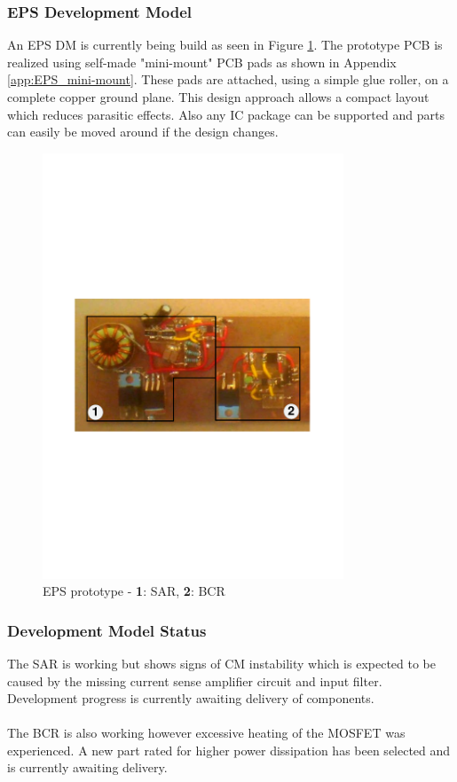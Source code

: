 \subsubsection{EPS Development Model}
An \ac{EPS} \ac{DM} is currently being build as seen in Figure \ref{fig:EPSprototype}. The prototype \ac{PCB} is realized using self-made "mini-mount" \ac{PCB} pads as shown in Appendix \ref{app:EPS_mini-mount}. These pads are attached, using a simple glue roller, on a complete copper ground plane. This design approach allows a compact layout which reduces parasitic effects. Also any \ac{IC} package can be supported and parts can easily be moved around if the design changes.
%
\begin{figure}[H]
\centering
\includegraphics[width=0.8\textwidth]{figures/fig_CDR_EPSprototype}
\caption[EPS prototype]{EPS prototype - \textbf{1}: SAR, \textbf{2}: BCR}
\label{fig:EPSprototype}
\end{figure}
%
\subsubsection*{Development Model Status}
The \ac{SAR} is working but shows signs of \ac{CM} instability which is expected to be caused by the missing current sense amplifier circuit and input filter. Development progress is currently awaiting delivery of components.
\\
\\
The \ac{BCR} is also working however excessive heating of the MOSFET was experienced. A new part rated for higher power dissipation has been selected and is currently awaiting delivery.
%
